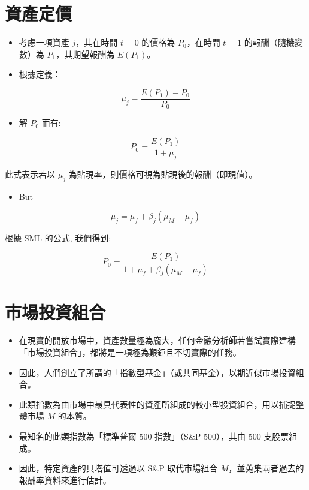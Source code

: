 \documentclass[letterpaper]{article}
\begin{document}
\section{資產定價}
\begin{itemize}
	\item 考慮一項資產 $j$，其在時間 $t=0$ 的價格為 $P_{0}$，在時間 $t=1$ 的報酬（隨機變數）為 $P_{1}$，其期望報酬為 $E\left(P_{1}\right)$。
	\item 根據定義：
\end{itemize}


$$
\mu_{j}=\frac{E\left(P_{1}\right)-P_{0}}{P_{0}}
$$

\begin{itemize}
  \item  解 $P_{0}$ 而有:
\end{itemize}

$$
P_{0}=\frac{E\left(P_{1}\right)}{1+\mu_{j}}
$$

此式表示若以 $\mu_{j}$ 為貼現率，則價格可視為貼現後的報酬（即現值）。


\begin{itemize}
  \item But
\end{itemize}

$$
\mu_{j}=\mu_{f}+\beta_{j}\left(\mu_{M}-\mu_{f}\right)
$$

根據 SML 的公式, 我們得到:

$$
P_{0}=\frac{E\left(P_{1}\right)}{1+\mu_{f}+\beta_{j}\left(\mu_{M}-\mu_{f}\right)}
$$

\section*{市場投資組合}
\begin{itemize}
	\item 在現實的開放市場中，資產數量極為龐大，任何金融分析師若嘗試實際建構「市場投資組合」，都將是一項極為艱鉅且不切實際的任務。
	\item 因此，人們創立了所謂的「指數型基金」（或共同基金），以期近似市場投資組合。
	\item 此類指數為由市場中最具代表性的資產所組成的較小型投資組合，用以捕捉整體市場 $M$ 的本質。
	\item 最知名的此類指數為「標準普爾 500 指數」（S\&P 500），其由 500 支股票組成。
	\item 因此，特定資產的貝塔值可透過以 S\&P 取代市場組合 $M$，並蒐集兩者過去的報酬率資料來進行估計。
\end{itemize}
\end{document}
